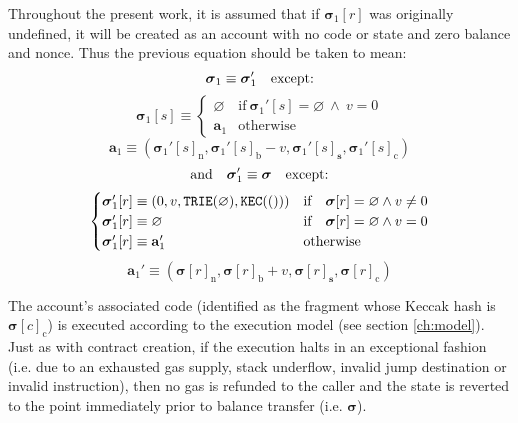 \documentclass[9pt,oneside]{amsart}
\begin{document}
\begin{multicols}{2}
Throughout the present work, it is assumed that if $\boldsymbol{\sigma}_1[r]$ was originally undefined, it will be created as an account with no code or state and zero balance and nonce. Thus the previous equation should be taken to mean:
\begin{equation}
\boldsymbol{\sigma}_1 \equiv \boldsymbol{\sigma}_1' \quad \text{except:} \\
\end{equation}
\begin{equation}
\boldsymbol{\sigma}_1[s] \equiv \begin{cases}
\varnothing & \text{if}\ \boldsymbol{\sigma}_1'[s] = \varnothing \ \wedge\ v = 0 \\
\mathbf{a}_1 &\text{otherwise}
\end{cases}
\end{equation}
\begin{equation}
\mathbf{a}_1 \equiv (\boldsymbol{\sigma}_1'[s]_{\mathrm{n}}, \boldsymbol{\sigma}_1'[s]_{\mathrm{b}} - v, \boldsymbol{\sigma}_1'[s]_{\mathbf{s}}, \boldsymbol{\sigma}_1'[s]_{\mathrm{c}})
\end{equation}
\begin{equation}
\text{and}\quad \boldsymbol{\sigma}_1' \equiv \boldsymbol{\sigma} \quad \text{except:} \\
\end{equation}
\begin{equation}
\begin{cases}
\boldsymbol{\sigma}_1'[r] \equiv (0, v, \mathtt{\tiny TRIE}(\varnothing), \mathtt{\tiny KEC}(())) & \text{if} \quad \boldsymbol{\sigma}[r] = \varnothing \wedge v \neq 0 \\
\boldsymbol{\sigma}_1'[r] \equiv \varnothing & \text{if}\quad \boldsymbol{\sigma}[r] = \varnothing \wedge v = 0 \\
\boldsymbol{\sigma}_1'[r] \equiv \mathbf{a}_1' & \text{otherwise}
\end{cases}
\end{equation}
\begin{equation}
\mathbf{a}_1' \equiv (\boldsymbol{\sigma}[r]_{\mathrm{n}}, \boldsymbol{\sigma}[r]_{\mathrm{b}} + v, \boldsymbol{\sigma}[r]_{\mathbf{s}}, \boldsymbol{\sigma}[r]_{\mathrm{c}})
\end{equation}

The account's associated code (identified as the fragment whose Keccak hash is $\boldsymbol{\sigma}[c]_{\mathrm{c}}$) is executed according to the execution model (see section \ref{ch:model}). Just as with contract creation, if the execution halts in an exceptional fashion (i.e. due to an exhausted gas supply, stack underflow, invalid jump destination or invalid instruction), then no gas is refunded to the caller and the state is reverted to the point immediately prior to balance transfer (i.e. $\boldsymbol{\sigma}$).


\end{multicols}
\end{document}
